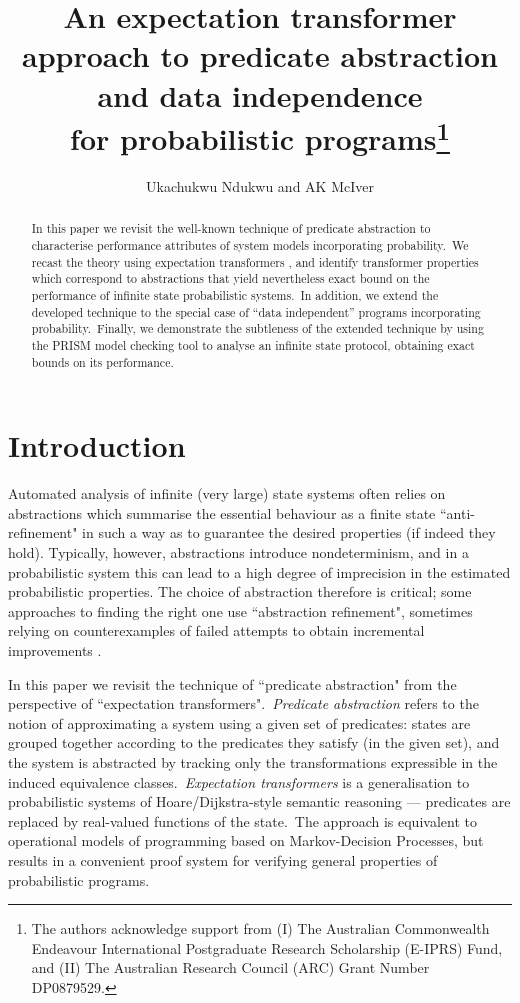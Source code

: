 \documentclass[numbers,copyright,creativecommons]{eptcs}
\title{An expectation transformer approach to predicate abstraction and data independence\\ for probabilistic programs\thanks{The authors acknowledge support from (I) The Australian Commonwealth Endeavour International
Postgraduate Research Scholarship (E-IPRS) Fund, and (II) The  Australian Research Council (ARC) Grant Number DP0879529.}}
\author{Ukachukwu Ndukwu
and AK McIver
\institute{Deptartment of Computing, Macquarie University, NSW 2109 Australia.}
\email{\{ukndukwu,anabel\}@science.mq.edu.au}
}
\begin{document}
\maketitle

\begin{abstract}
In this paper we revisit the well-known technique of predicate abstraction to characterise performance attributes of system models incorporating
probability.\ We recast the theory using expectation transformers \cite{ARP}, and identify transformer properties which correspond to abstractions that yield nevertheless exact bound on the performance of infinite state probabilistic systems.\ In addition, we extend the developed technique to the special case of  ``data independent'' programs \cite{Wolper86} incorporating probability.\ Finally, we demonstrate the subtleness of the extended technique by using the PRISM model checking tool \cite{PRISM} to analyse an infinite state protocol, obtaining exact bounds on its performance.




\end{abstract}

\setcounter{section}{0}

\section{Introduction}\label{s0154}
Automated analysis of infinite (very large) state systems often relies on abstractions which summarise the essential behaviour as a finite state ``anti-refinement" in such a way as to guarantee the desired properties (if indeed they hold). Typically, however, abstractions introduce nondeterminism, and in a probabilistic system this can lead to a high degree of imprecision in the estimated probabilistic properties. The choice of abstraction therefore is critical; some approaches to finding the right one use ``abstraction refinement", sometimes relying on counterexamples of failed attempts to obtain incremental improvements \cite{CEGAR}.

In this paper we revisit the technique of ``predicate abstraction" from the perspective of ``expectation
transformers".\ \emph{Predicate abstraction} refers to the notion of approximating a system using a given set of predicates: states are grouped together according to the predicates they satisfy (in the given set), and the system is abstracted by tracking only the transformations expressible in the induced equivalence classes.\ \emph{Expectation transformers} \cite{ARP} is a generalisation to probabilistic systems of Hoare/Dijkstra-style semantic reasoning \cite{Dijkstra76} --- predicates are replaced by real-valued functions of the state.\ The approach is equivalent to operational models of programming based on Markov-Decision Processes, but results in a convenient proof system for verifying general properties of probabilistic programs.
\end{document}
